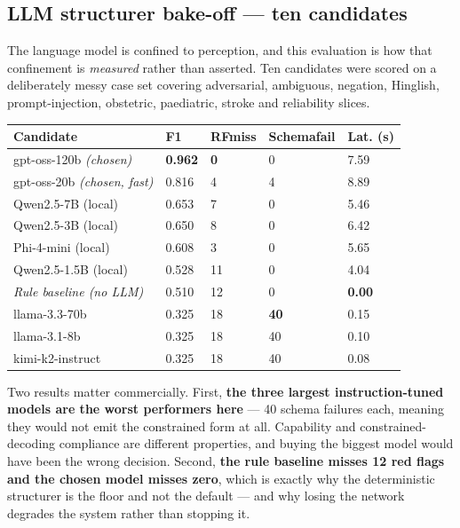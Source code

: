 \documentclass[10pt,a4paper,twocolumn]{article}
\begin{document}
\subsection{LLM structurer bake-off --- ten candidates}
The language model is confined to perception, and this evaluation is how that confinement is
\emph{measured} rather than asserted. Ten candidates were scored on a deliberately messy case set
covering adversarial, ambiguous, negation, Hinglish, prompt-injection, obstetric, paediatric,
stroke and reliability slices.

\begin{center}\footnotesize\sffamily
\begin{tabular}{@{}p{1.95cm}p{0.78cm}p{0.86cm}p{1.05cm}p{0.98cm}@{}}
\toprule
\rowcolor{AccPurple!10}
\textbf{Candidate} & \textbf{F1} & \textbf{RF}\newline\textbf{miss} & \textbf{Schema}\newline\textbf{fail} & \textbf{Lat. (s)}\\
\midrule
\rowcolor{AccPurple!7}
gpt-oss-120b \emph{(chosen)} & \textbf{0.962} & \textbf{0} & 0 & 7.59\\
\rowcolor{AccPurple!7}
gpt-oss-20b \emph{(chosen, fast)} & 0.816 & 4 & 4 & 8.89\\
Qwen2.5-7B (local) & 0.653 & 7 & 0 & 5.46\\
Qwen2.5-3B (local) & 0.650 & 8 & 0 & 6.42\\
Phi-4-mini (local) & 0.608 & 3 & 0 & 5.65\\
Qwen2.5-1.5B (local) & 0.528 & 11 & 0 & 4.04\\
\emph{Rule baseline (no LLM)} & 0.510 & 12 & 0 & \textbf{0.00}\\
llama-3.3-70b & 0.325 & 18 & \textbf{40} & 0.15\\
llama-3.1-8b & 0.325 & 18 & 40 & 0.10\\
kimi-k2-instruct & 0.325 & 18 & 40 & 0.08\\
\bottomrule
\end{tabular}
\end{center}

\vspace{3pt}
Two results matter commercially. First, \textbf{the three largest instruction-tuned models are the
worst performers here} --- 40 schema failures each, meaning they would not emit the constrained
form at all. Capability and constrained-decoding compliance are different properties, and buying
the biggest model would have been the wrong decision. Second, \textbf{the rule baseline misses 12
red flags and the chosen model misses zero}, which is exactly why the deterministic structurer is
the floor and not the default --- and why losing the network degrades the system rather than
stopping it.
\end{document}
